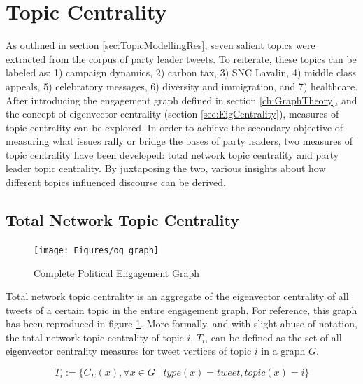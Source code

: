 \section{Topic Centrality}\label{sec:TopicCentrality}

As outlined in section \ref{sec:TopicModellingRes}, seven salient topics were
extracted from the corpus of party leader tweets. To reiterate, these topics can
be labeled as: 1) campaign dynamics, 2) carbon tax, 3) SNC Lavalin, 4) middle
class appeals, 5) celebratory messages, 6) diversity and immigration, and 7)
healthcare. After introducing the engagement graph defined in section
\ref{ch:GraphTheory}, and the concept of eigenvector centrality (section
\ref{sec:EigCentrality}), measures of topic centrality can be explored. In order
to achieve the secondary objective of measuring what issues rally or bridge the
bases of party leaders, two measures of topic centrality have been developed:
total network topic centrality and party leader topic centrality. By juxtaposing
the two, various insights about how different topics influenced discourse can be
derived.

\subsection{Total Network Topic Centrality}\label{sec:NetTopicCentrality}

\begin{singlespacing}
    \begin{figure}[H]
    \centering
    \texttt{[image: Figures/og\_graph]}
    \caption[Complete Political Engagement Graph]{Complete Political Engagement Graph}
    \label{fig:og_graph_copy}
    \end{figure}
\end{singlespacing}

Total network topic centrality is an aggregate of the eigenvector centrality of
all tweets of a certain topic in the entire engagement graph. For reference,
this graph has been reproduced in figure \ref{fig:og_graph_copy}. More formally,
and with slight abuse of notation, the total network topic centrality of topic
$i$, $T_{i}$, can be defined as the set of all eigenvector centrality measures for tweet
vertices of topic $i$ in a graph $G$. 

\begin{equation}
    T_{i} := \{ C_{E}(x) , \forall x \in G \mid type(x)=tweet, topic(x)=i \}
\end{equation}

